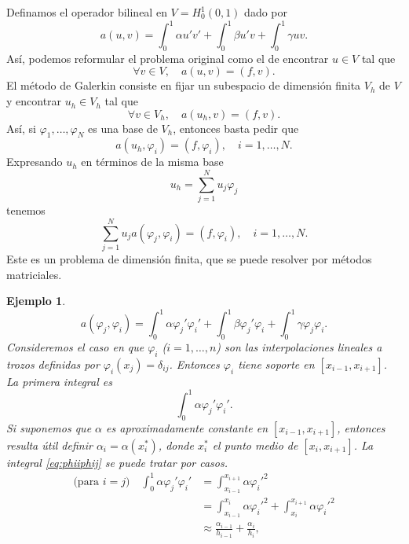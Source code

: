 \documentclass[11pt,letterpaper]{report}
\newtheorem{example}{Ejemplo}
\renewcommand\phi\varphi
\begin{document}
Definamos el operador bilineal en $V=H^{1}_0(0,1)$ dado por
\begin{equation}
  a(u,v)
  = 
  \int_0^{1} \alpha u'v' + \int_0^{1} \beta u'v + \int_0^{1} \gamma u v
.\end{equation}
Así, podemos reformular el problema original como el de encontrar
$u\in V$ tal que
\begin{equation}
  \forall v\in V,\quad a(u,v) = (f,v)
.\end{equation}
El método de Galerkin consiste en fijar un subespacio de dimensión
finita $V_h$ de $V$ y encontrar $u_h\in V_h$ tal que
\begin{equation}
  \forall v\in V_h, \quad a(u_h,v) = (f,v)
.\end{equation}
Así, si $\phi_1,\dots,\phi_N$ es una base de $V_h$, entonces basta
pedir que
\begin{equation}
  a(u_h,\phi_i) = (f,\phi_i), \quad i=1,\dots,N
.\end{equation}
Expresando $u_h$ en términos de la misma base
\begin{equation}
  u_h = \sum_{j=1}^{N}u_j\phi_j
\end{equation}
tenemos
\begin{equation}
  \sum_{j=1}^{N} u_j a(\phi_j,\phi_i) = (f,\phi_i), \quad i=1,\dots,N
.\end{equation}
Este es un problema de dimensión finita, que se puede resolver por
métodos matriciales.

\begin{example}
  \begin{equation}
    a(\phi_j,\phi_i)
    = \int_{0}^{1} \alpha\phi_j'\phi_i'
    +
    \int_{0}^{1}\beta\phi_j'\phi_i
    +
    \int_{0}^{1}\gamma\phi_j\phi_i
  .\end{equation}
  Consideremos el caso en que $\phi_i$ ($i=1,\dots,n$) son las
  interpolaciones lineales a trozos definidas por
  $\phi_i(x_j)=\delta_{ij}$. Entonces $\phi_i$ tiene soporte en
  $[x_{i-1},x_{i+1}]$.
  La primera integral es
  \begin{equation}\label{eq:phiiphij}
    \int_{0}^{1} \alpha\phi_j'\phi_i'
  .\end{equation}
  Si suponemos que $\alpha$ es aproximadamente
  constante en $[x_{i-1},x_{i+1}]$, entonces resulta útil definir
  $\alpha_{i}=\alpha(x_i^{*})$, donde $x_i^{*}$ el punto
  medio de $[x_i,x_{i+1}]$. La integral \eqref{eq:phiiphij}
  se puede tratar por casos.
  \begin{align}
    \text{(para $i=j$)}\quad
    \int_{0}^{1} \alpha\phi_j'\phi_i'
    &= \int_{x_{i-1}}^{x_{i+1}}\alpha\phi_i'^{2} \\
    &= \int_{x_{i-1}}^{x_{i}}\alpha\phi_i'^{2}
    + \int_{x_{i}}^{x_{i+1}}\alpha\phi_i'^{2} \\
    &\approx \frac{\alpha_{i-1}}{h_{i-1}} + \frac{\alpha_i}{h_i}
  ,\end{align}
\end{example}
\end{document}
